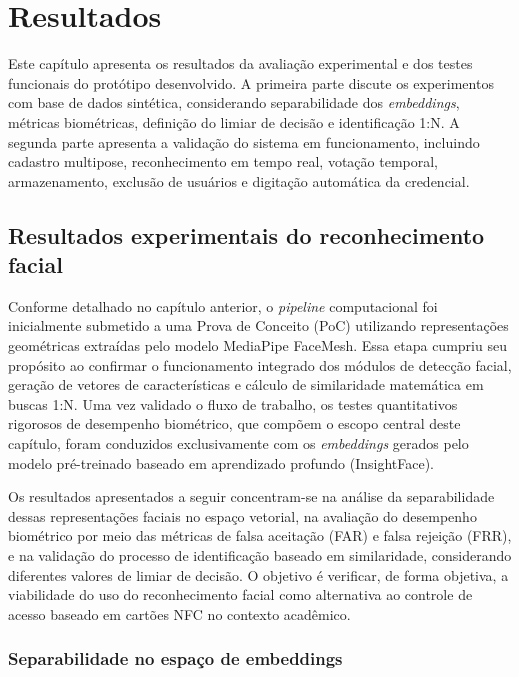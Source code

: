 \chapter{Resultados}
\label{chap:resultados}

Este capítulo apresenta os resultados da avaliação experimental e dos testes funcionais do protótipo desenvolvido. A primeira parte discute os experimentos com base de dados sintética, considerando separabilidade dos \textit{embeddings}, métricas biométricas, definição do limiar de decisão e identificação 1:N. A segunda parte apresenta a validação do sistema em funcionamento, incluindo cadastro multipose, reconhecimento em tempo real, votação temporal, armazenamento, exclusão de usuários e digitação automática da credencial.

\section{Resultados experimentais do reconhecimento facial}

Conforme detalhado no capítulo anterior, o \textit{pipeline} computacional foi inicialmente submetido a uma Prova de Conceito (\acs{PoC}) utilizando representações geométricas extraídas pelo modelo MediaPipe FaceMesh. Essa etapa cumpriu seu propósito ao confirmar o funcionamento integrado dos módulos de detecção facial, geração de vetores de características e cálculo de similaridade matemática em buscas 1:N. Uma vez validado o fluxo de trabalho, os testes quantitativos rigorosos de desempenho biométrico, que compõem o escopo central deste capítulo, foram conduzidos exclusivamente com os \textit{embeddings} gerados pelo modelo pré-treinado baseado em aprendizado profundo (InsightFace). 

Os resultados apresentados a seguir concentram-se na análise da separabilidade dessas representações faciais no espaço vetorial, na avaliação do desempenho biométrico por meio das métricas de falsa aceitação (\acs{FAR}) e falsa rejeição (\acs{FRR}), e na validação do processo de identificação baseado em similaridade, considerando diferentes valores de limiar de decisão. O objetivo é verificar, de forma objetiva, a viabilidade do uso do reconhecimento facial como alternativa ao controle de acesso baseado em cartões \acs{NFC} no contexto acadêmico.


\subsection{Separabilidade no espaço de embeddings}

